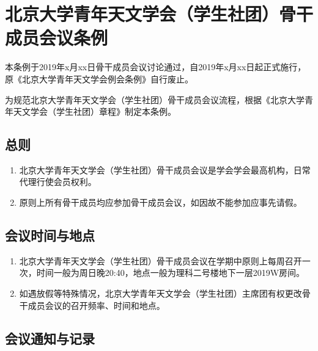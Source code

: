 \chapter{北京大学青年天文学会（学生社团）骨干成员会议条例}

本条例于2019年x月xx日骨干成员会议讨论通过，自2019年x月xx日起正式施行，原《北京大学青年天文学会例会条例》自行废止。

为规范北京大学青年天文学会（学生社团）骨干成员会议流程，根据《北京大学青年天文学会（学生社团）章程》制定本条例。

\section{总则}

\begin{enumerate}
    \item 北京大学青年天文学会（学生社团）骨干成员会议是学会学会最高机构，日常代理行使会员权利。
    
    \item 原则上所有骨干成员均应参加骨干成员会议，如因故不能参加应事先请假。
\end{enumerate}

\section{会议时间与地点}

\begin{enumerate}[resume]
    \item 北京大学青年天文学会（学生社团）骨干成员会议在学期中原则上每周召开一次，时间一般为周日晚20:40，地点一般为理科二号楼地下一层2019W房间。
    
    \item 如遇放假等特殊情况，北京大学青年天文学会（学生社团）主席团有权更改骨干成员会议的召开频率、时间和地点。
\end{enumerate}

\section{会议通知与记录}

